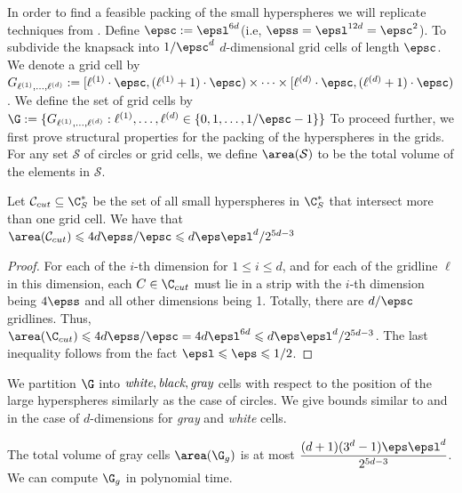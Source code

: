 	In order to find a feasible packing of the small hyperspheres we will replicate techniques from .  Define \(\epsc:=\epsl^{6d}\)(i.e, \(\epss=\epsl^{12d}=\epsc^2\)). To subdivide the knapsack into \(1/\epsc^d\) $d$-dimensional grid cells of length \(\epsc\). We denote a grid cell by \(G_{\ell^{(1)},\dots,\ell^{(d)}}:=[\ell^{(1)}\cdot\epsc,(\ell^{(1)}+1)\cdot\epsc)\times\dots\times[\ell^{(d)}\cdot\epsc,(\ell^{(d)}+1)\cdot\epsc)\). We define the set of grid cells by \(\G:=\{G_{\ell^{(1)},\dots,\ell^{(d)}}:\ell^{(1)},\dots,\ell^{(d)}\in\{0,1,\dots,1/\epsc-1\}\}\) To proceed further, we first prove structural properties for the packing of the hyperspheres in the grids. For any set \(\mathcal{S}\) of circles or grid cells, we define \(\area(\mathcal{S})\) to be the total volume of the elements in \(\mathcal{S}\).
	\begin{lem}\label{lem:small-hypersphere-grid-cells}
		Let \(\mathcal{C}_{cut}\subseteq\C_{S}^{*}\) be the set of all small hyperspheres in \(\C_{S}^{*}\) that intersect more than one grid cell. We have that \(\area(\mathcal{C}_{cut})\leqslant4d\epss/\epsc\leqslant d\eps\epsl^d/2^{5d-3}\)
	\end{lem}
	\begin{proof}
		For each of the \(i\)-th dimension for \(1\leqslant i \leqslant d\), and for each of the gridline \(\ell\) in this dimension, each \(C\in\C_{cut}\) must lie in a strip with the \(i\)-th dimension being \(4\epss\) and all other dimensions being 1. Totally, there are \(d/\epsc\) gridlines. Thus, \(\area(\C_{cut})\leqslant4d\epss/\epsc=4d\epsl^{6d}\leqslant d\eps\epsl^d/2^{5d-3}\). The last inequality follows from the fact \(\epsl\leqslant \eps\leqslant 1/2\).
	\end{proof}
	We partition \(\G\) into \(\emph{white},\emph{black},\emph{gray}\) cells with respect to the position of the large hyperspheres similarly as the case of circles. We give bounds similar to  and  in the case of $d$-dimensions for \emph{gray} and \emph{white} cells.
	\begin{lem}\label{lem:gray-circles-d}
		The total volume of gray cells \(\area(\G_{g})\) is at most \(\dfrac{(d+1)(3^d-1)\eps\epsl^d}{2^{5d-3}}\). We can compute \(\G_g\) in polynomial time.
	\end{lem}
